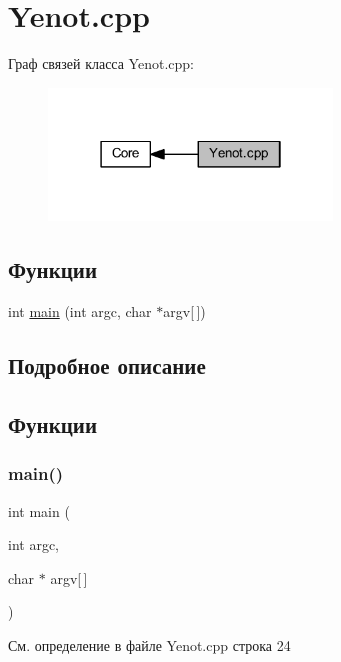 \hypertarget{group__yenotcpp}{}\section{Yenot.\+cpp}
\label{group__yenotcpp}
Граф связей класса Yenot.\+cpp\+:
\nopagebreak
\begin{figure}[H]
\begin{center}
\leavevmode
\includegraphics[width=214pt]{group__yenotcpp}
\end{center}
\end{figure}
\subsection*{Функции}
\begin{DoxyCompactItemize}
\item 
int \mbox{\hyperlink{group__yenotcpp_ga0ddf1224851353fc92bfbff6f499fa97}{main}} (int argc, char $\ast$argv\mbox{[}$\,$\mbox{]})
\end{DoxyCompactItemize}


\subsection{Подробное описание}


\subsection{Функции}
\mbox{\label{group__yenotcpp_ga0ddf1224851353fc92bfbff6f499fa97}} 
\subsubsection{\texorpdfstring{main()}{main()}}
{\footnotesize\ttfamily int main (\begin{DoxyParamCaption}\item[{int}]{argc,  }\item[{char $\ast$}]{argv\mbox{[}$\,$\mbox{]} }\end{DoxyParamCaption})}



См. определение в файле Yenot.\+cpp строка 24

